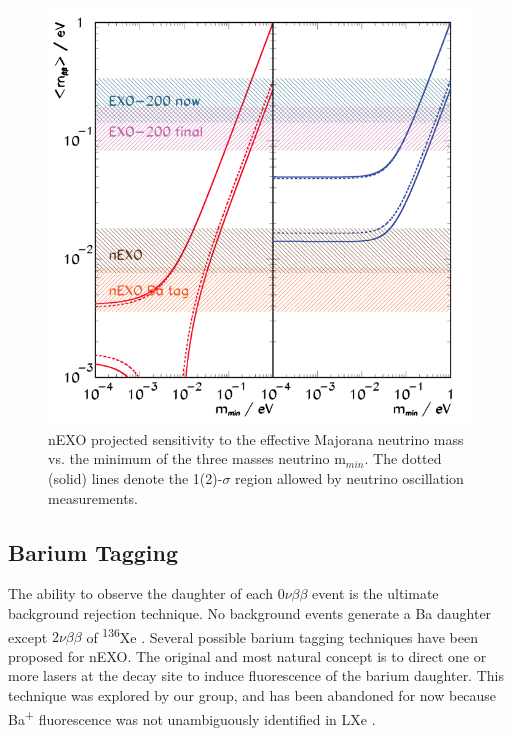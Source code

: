 
\begin{figure} %
	\centering
	\includegraphics[width=.7\textwidth]{figures/sensitivity_v2.png}
	\caption{nEXO projected sensitivity to the effective Majorana neutrino mass vs. the minimum of the three masses neutrino m$_{min}$.  The dotted (solid) lines denote the 1(2)-$\sigma$ region allowed by neutrino oscillation measurements.}
\label{fig:sensitivity_nEXO}
\end{figure}

\subsection{Barium Tagging}

The ability to observe the daughter of each $0\nu\beta\beta$ event is the ultimate background rejection technique.  No background events generate a Ba daughter except $2\nu\beta\beta$ of \textsuperscript{136}Xe \cite{Moe1991}.  Several possible barium tagging techniques have been proposed for nEXO.  The original and most natural concept is to direct one or more lasers at the decay site to induce fluorescence of the barium daughter.  This technique was explored by our group, and has been abandoned for now because Ba\textsuperscript{+} fluorescence was not unambiguously identified in LXe \cite{Kendy}.



